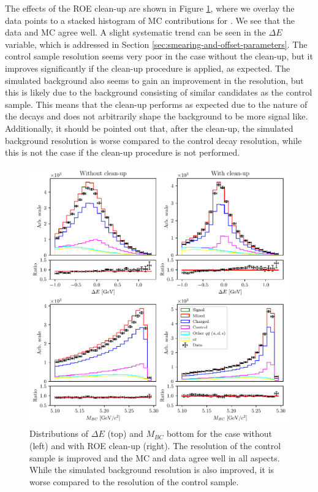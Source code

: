 The effects of the ROE clean-up are shown in Figure \ref{fig:roe_val}, where we overlay the data points to a stacked histogram of MC contributions for \vars. We see that the data and MC agree well. A slight systematic trend can be seen in the $\Delta E$ variable, which is addressed in Section \ref{sec:smearing-and-offset-parameters}. The control sample resolution seems very poor in the case without the clean-up, but it improves significantly if the clean-up procedure is applied, as expected. The simulated background also seems to gain an improvement in the resolution, but this is likely due to the background consisting of similar candidates as the control sample. This means that the clean-up performs as expected due to the nature of the decays and does not arbitrarily shape the background to be more signal like. Additionally, it should be pointed out that, after the clean-up, the simulated background resolution is worse compared to the control decay resolution, while this is not the case if the clean-up procedure is not performed.
\begin{figure}[H]
	\centering
	\captionsetup{width=0.8\linewidth}
	\includegraphics[width=\linewidth]{fig/roe_val}
	\caption{Distributions of $\Delta E$ (top) and $M_{BC}$ bottom for the case without (left) and with ROE clean-up (right). The resolution of the control sample is improved and the MC and data agree well in all aspects. While the simulated background resolution is also improved, it is worse compared to the resolution of the control sample.}
	\label{fig:roe_val}
\end{figure}

